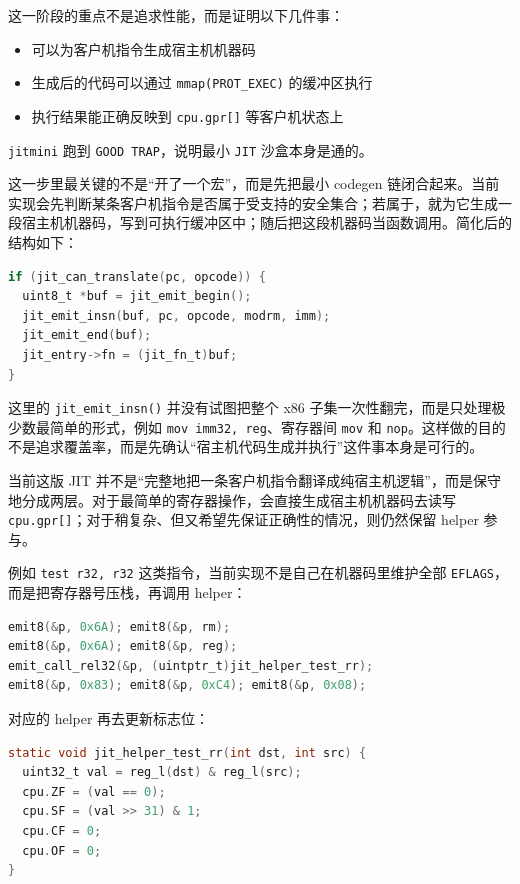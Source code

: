 \documentclass[a4paper]{article}
\begin{document}
这一阶段的重点不是追求性能，而是证明以下几件事：

\begin{itemize}
  \item 可以为客户机指令生成宿主机机器码
  \item 生成后的代码可以通过 \texttt{mmap(PROT\_EXEC)} 的缓冲区执行
  \item 执行结果能正确反映到 \texttt{cpu.gpr[]} 等客户机状态上
\end{itemize}

\texttt{jitmini} 跑到 \texttt{GOOD TRAP}，说明最小 \texttt{JIT} 沙盒本身是通的。

这一步里最关键的不是“开了一个宏”，而是先把最小 codegen 链闭合起来。当前实现会先判断某条客户机指令是否属于受支持的安全集合；若属于，就为它生成一段宿主机机器码，写到可执行缓冲区中；随后把这段机器码当函数调用。简化后的结构如下：

\begin{lstlisting}[language=C]
if (jit_can_translate(pc, opcode)) {
  uint8_t *buf = jit_emit_begin();
  jit_emit_insn(buf, pc, opcode, modrm, imm);
  jit_emit_end(buf);
  jit_entry->fn = (jit_fn_t)buf;
}
\end{lstlisting}

这里的 \texttt{jit\_emit\_insn()} 并没有试图把整个 x86 子集一次性翻完，而是只处理极少数最简单的形式，例如 \texttt{mov imm32, reg}、寄存器间 \texttt{mov} 和 \texttt{nop}。这样做的目的不是追求覆盖率，而是先确认“宿主机代码生成并执行”这件事本身是可行的。

当前这版 JIT 并不是“完整地把一条客户机指令翻译成纯宿主机逻辑”，而是保守地分成两层。对于最简单的寄存器操作，会直接生成宿主机机器码去读写 \texttt{cpu.gpr[]}；对于稍复杂、但又希望先保证正确性的情况，则仍然保留 helper 参与。

例如 \texttt{test r32, r32} 这类指令，当前实现不是自己在机器码里维护全部 \texttt{EFLAGS}，而是把寄存器号压栈，再调用 helper：

\begin{lstlisting}[language=C]
emit8(&p, 0x6A); emit8(&p, rm);
emit8(&p, 0x6A); emit8(&p, reg);
emit_call_rel32(&p, (uintptr_t)jit_helper_test_rr);
emit8(&p, 0x83); emit8(&p, 0xC4); emit8(&p, 0x08);
\end{lstlisting}

对应的 helper 再去更新标志位：

\begin{lstlisting}[language=C]
static void jit_helper_test_rr(int dst, int src) {
  uint32_t val = reg_l(dst) & reg_l(src);
  cpu.ZF = (val == 0);
  cpu.SF = (val >> 31) & 1;
  cpu.CF = 0;
  cpu.OF = 0;
}
\end{lstlisting}
\end{document}
